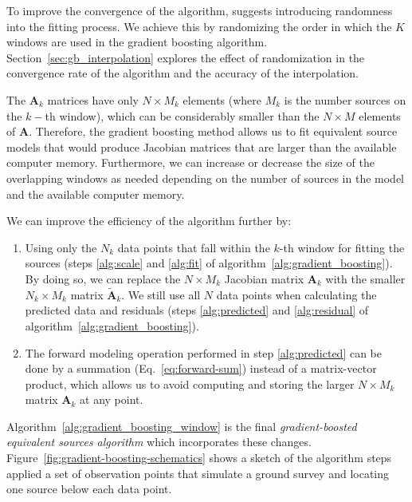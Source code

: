 To improve the convergence of the algorithm, \citet{friedman2002} suggests
introducing randomness into the fitting process. We achieve this by randomizing
the order in which the $K$ windows are used in the gradient boosting algorithm.
Section~\ref{sec:gb_interpolation} explores the effect of randomization in the
convergence rate of the algorithm and the accuracy of the interpolation.

The $\mathbf{A}_k$ matrices have only $N \times M_k$ elements
(where $M_k$ is the number sources on the $k-$th window), which can be
considerably smaller than the $N \times M$ elements of $\mathbf{A}$.
Therefore, the gradient boosting method allows us to fit
equivalent source models that would produce Jacobian matrices that are larger
than the available computer memory.
Furthermore, we can increase or decrease the size of the overlapping windows as
needed depending on the number of sources in the model and the available
computer memory.

We can improve the efficiency of the algorithm further by:

\begin{enumerate}
  \item Using only the $N_k$ data points that fall within the $k$-th window for
    fitting the sources (steps \ref{alg:scale} and \ref{alg:fit} of
    algorithm~\ref{alg:gradient_boosting}).
    By doing so, we can replace the $N \times M_k$ Jacobian matrix $\mathbf{A}_k$
    with the smaller $N_k \times M_k$ matrix $\tilde{\mathbf{A}}_k$.
    We still use all $N$ data points when calculating the predicted data and
    residuals (steps \ref{alg:predicted} and \ref{alg:residual} of
    algorithm~\ref{alg:gradient_boosting}).
  \item The forward modeling operation performed in step \ref{alg:predicted}
    can be done by a summation (Eq.~\ref{eq:forward-sum}) instead of a
    matrix-vector product, which allows us to avoid computing and storing the
    larger $N \times M_k$ matrix $\mathbf{A}_k$ at any point.
\end{enumerate}

Algorithm~\ref{alg:gradient_boosting_window} is the final
\textit{gradient-boosted equivalent sources algorithm} which incorporates these
changes.
Figure~\ref{fig:gradient-boosting-schematics} shows a sketch of the algorithm
steps applied a set of observation points that simulate a ground survey and
locating one source below each data point.

